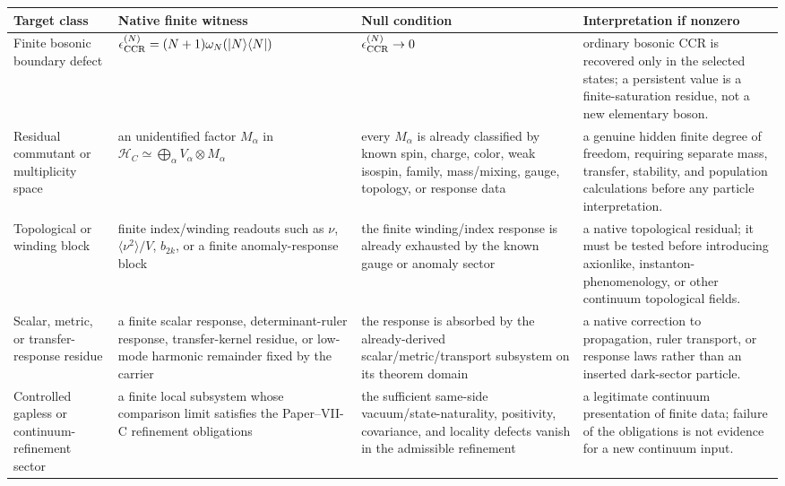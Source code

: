 \documentclass[12pt,a4paper]{article}
\begin{document}
\begin{table}[htbp]
\centering
\scriptsize
\begin{tabularx}{\textwidth}{@{}
>{\raggedright\arraybackslash}p{}
>{\raggedright\arraybackslash}p{}
>{\raggedright\arraybackslash}p{}
>{\raggedright\arraybackslash}X
@{}}
\toprule
\textbf{Target class} & \textbf{Native finite witness} & \textbf{Null condition} & \textbf{Interpretation if nonzero} \\
\midrule
Finite bosonic boundary defect
& \(\epsilon_{\rm CCR}^{(N)}=(N+1)\omega_N(|N\rangle\langle N|)\)
& \(\epsilon_{\rm CCR}^{(N)}\to0\)
& ordinary bosonic CCR is recovered only in the selected states; a persistent value is a finite-saturation residue, not a new elementary boson. \\

Residual commutant or multiplicity space
& an unidentified factor \(M_\alpha\) in
\(\mathcal H_C\simeq\bigoplus_\alpha V_\alpha\otimes M_\alpha\)
& every \(M_\alpha\) is already classified by known spin, charge, color, weak isospin, family, mass/mixing, gauge, topology, or response data
& a genuine hidden finite degree of freedom, requiring separate mass, transfer, stability, and population calculations before any particle interpretation. \\

Topological or winding block
& finite index/winding readouts such as \(\nu\), \(\langle\nu^2\rangle/V\), \(b_{2k}\), or a finite anomaly-response block
& the finite winding/index response is already exhausted by the known gauge or anomaly sector
& a native topological residual; it must be tested before introducing axionlike, instanton-phenomenology, or other continuum topological fields. \\

Scalar, metric, or transfer-response residue
& a finite scalar response, determinant-ruler response, transfer-kernel residue, or low-mode harmonic remainder fixed by the carrier
& the response is absorbed by the already-derived scalar/metric/transport subsystem on its theorem domain
& a native correction to propagation, ruler transport, or response laws rather than an inserted dark-sector particle. \\

Controlled gapless or continuum-refinement sector
& a finite local subsystem whose comparison limit satisfies the Paper--VII-C refinement obligations
& the sufficient same-side vacuum/state-naturality, positivity, covariance, and locality defects vanish in the admissible refinement
& a legitimate continuum presentation of finite data; failure of the obligations is not evidence for a new continuum input. \\


\end{tabularx}
\end{table}
\end{document}
